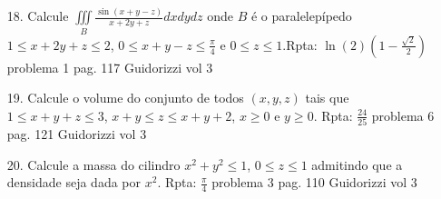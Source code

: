\begin{itemize}
	\item [18.] Calcule  $\iiint\limits_B\frac{\sin (x+y-z)}{x+2y+z}dxdydz$ onde $B$ é o paralelepípedo $1\leqslant x+2y+z\leqslant 2$, $0\leqslant x+y-z\leqslant \frac{\pi}{4}$ e $0\leqslant z \leqslant 1$.Rpta: $\ln(2)(1-\frac{\sqrt{2}}{2})$
	 problema 1 pag. 117 Guidorizzi vol 3 
\end{itemize}
\begin{itemize}
	\item [19.] Calcule o volume do conjunto de todos $(x,y,z)$ tais que $1\leqslant x+y+z\leqslant 3$, $x+y\leqslant z \leqslant x+y+2$, $x\geqslant 0 $ e $y\geqslant 0$. Rpta: $\frac{24}{25}$
	 problema 6 pag. 121 Guidorizzi vol 3 
\end{itemize}
\begin{itemize}
\item [20.] Calcule a massa do cilindro $x^{2}+y^{2}\leqslant 1$, $0\leqslant z \leqslant 1$ admitindo que a densidade seja dada por $x^{2}$. Rpta: $\frac{\pi}{4} $ 
 problema 3 pag. 110 Guidorizzi vol 3 
\end{itemize}

